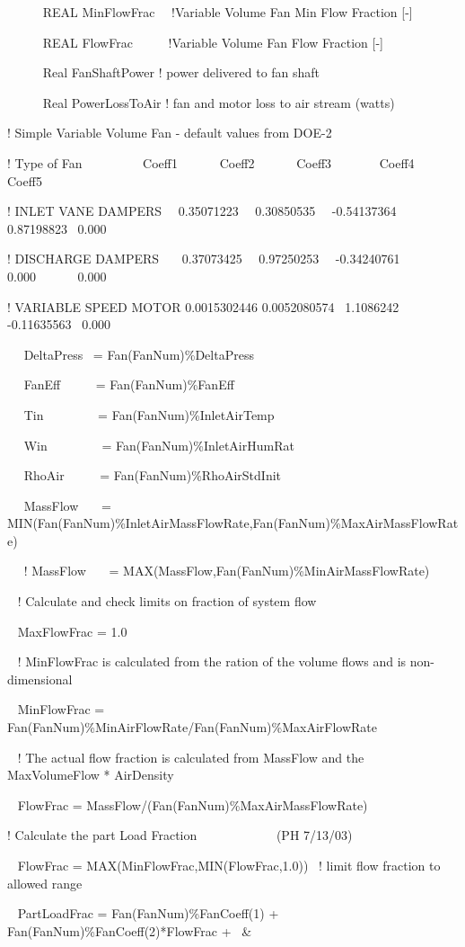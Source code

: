 ~~~~~ REAL MinFlowFrac~~ !Variable Volume Fan Min Flow Fraction {[}-{]}

~~~~~ REAL FlowFrac~~~~~ !Variable Volume Fan Flow Fraction {[}-{]}

~~~~~ Real FanShaftPower ! power delivered to fan shaft

~~~~~ Real PowerLossToAir ! fan and motor loss to air stream (watts)

! Simple Variable Volume Fan - default values from DOE-2

! Type of Fan~~~~~~~~~ Coeff1~~~~~~ Coeff2~~~~~~ Coeff3~~~~~~~ Coeff4~~~~~ Coeff5

! INLET VANE DAMPERS~~ 0.35071223~~ 0.30850535~~ -0.54137364~~ 0.87198823~ 0.000

! DISCHARGE DAMPERS~~~ 0.37073425~~ 0.97250253~~ -0.34240761~~ 0.000~~~~~~ 0.000

! VARIABLE SPEED MOTOR 0.0015302446 0.0052080574~ 1.1086242~~ -0.11635563~ 0.000

~~ DeltaPress~ = Fan(FanNum)\%DeltaPress

~~ FanEff~~~~~ = Fan(FanNum)\%FanEff

~~ Tin~~~~~~~~ = Fan(FanNum)\%InletAirTemp

~~ Win~~~~~~~~ = Fan(FanNum)\%InletAirHumRat

~~ RhoAir~~~~~ = Fan(FanNum)\%RhoAirStdInit

~~ MassFlow~~~ = MIN(Fan(FanNum)\%InletAirMassFlowRate,Fan(FanNum)\%MaxAirMassFlowRate)

~~ ! MassFlow~~~ = MAX(MassFlow,Fan(FanNum)\%MinAirMassFlowRate)

~ ! Calculate and check limits on fraction of system flow

~ MaxFlowFrac = 1.0

~ ! MinFlowFrac is calculated from the ration of the volume flows and is non-dimensional

~ MinFlowFrac = Fan(FanNum)\%MinAirFlowRate/Fan(FanNum)\%MaxAirFlowRate

~ ! The actual flow fraction is calculated from MassFlow and the MaxVolumeFlow * AirDensity

~ FlowFrac = MassFlow/(Fan(FanNum)\%MaxAirMassFlowRate)

! Calculate the part Load Fraction~~~~~~~~~~~~ (PH 7/13/03)

~ FlowFrac = MAX(MinFlowFrac,MIN(FlowFrac,1.0))~ ! limit flow fraction to allowed range

~ PartLoadFrac = Fan(FanNum)\%FanCoeff(1) + Fan(FanNum)\%FanCoeff(2)*FlowFrac +~ \&

